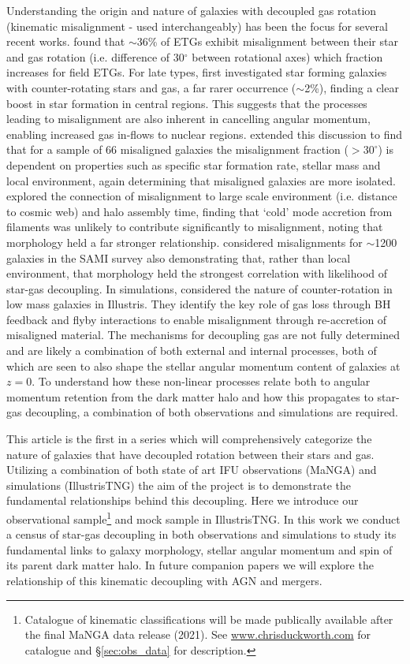 \documentclass[fleqn,usenatbib]{mnras}
\begin{document}
Understanding the origin and nature of galaxies with decoupled gas rotation (kinematic misalignment - used interchangeably) has been the focus for several recent works. \citet{davis2011} found that $\sim 36$\% of ETGs exhibit misalignment between their star and gas rotation (i.e. difference of 30$^{\circ}$ between rotational axes) which fraction increases for field ETGs. For late types, \citet{chen2016} first investigated star forming galaxies with counter-rotating stars and gas, a far rarer occurrence ($\sim$2\%), finding a clear boost in star formation in central regions. This suggests that the processes leading to misalignment are also inherent in cancelling angular momentum, enabling increased gas in-flows to nuclear regions. \citet{jin2016} extended this discussion to find that for a sample of 66 misaligned galaxies the misalignment fraction ($> 30^{\circ}$) is dependent on properties such as specific star formation rate, stellar mass and local environment, again determining that misaligned galaxies are more isolated. \citet{duckworth2019} explored the connection of misalignment to large scale environment (i.e. distance to cosmic web) and halo assembly time, finding that `cold' mode accretion from filaments was unlikely to contribute significantly to misalignment, noting that morphology held a far stronger relationship. \citep{bryant2019} considered misalignments for $\sim$1200 galaxies in the SAMI survey also demonstrating that, rather than local environment, that morphology held the strongest correlation with likelihood of star-gas decoupling. In simulations, \citet{starkenburg+19} considered the nature of counter-rotation in low mass galaxies in Illustris. They identify the key role of gas loss through BH feedback and flyby interactions to enable misalignment through re-accretion of misaligned material. The mechanisms for decoupling gas are not fully determined and are likely a combination of both external and internal processes, both of which are seen to also shape the stellar angular momentum content of galaxies at $z=0$. To understand how these non-linear processes relate both to angular momentum retention from the dark matter halo and how this propagates to star-gas decoupling, a combination of both observations and simulations are required. 

This article is the first in a series which will comprehensively categorize the nature of galaxies that have decoupled rotation between their stars and gas. Utilizing a combination of both state of art IFU observations (MaNGA) and simulations (IllustrisTNG) the aim of the project is to demonstrate the fundamental relationships behind this decoupling. Here we introduce our observational sample\footnote{Catalogue of kinematic classifications will be made publically available after the final MaNGA data release (2021). See \url{www.chrisduckworth.com} for catalogue and \S\ref{sec:obs_data} for description.} and mock sample in IllustrisTNG. In this work we conduct a census of star-gas decoupling in both observations and simulations to study its fundamental links to galaxy morphology, stellar angular momentum and spin of its parent dark matter halo. In future companion papers we will explore the relationship of this kinematic decoupling with AGN and mergers.
\end{document}
